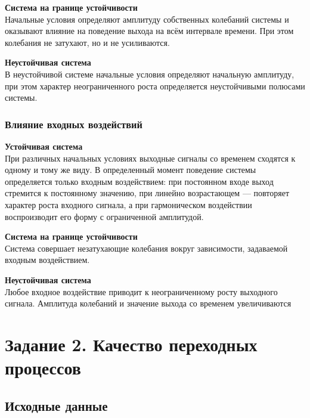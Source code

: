 \documentclass[a5paper, 10pt]{article}
\theoremstyle{definition}
\theoremstyle{plain}
\theoremstyle{remark}
\begin{document}
\vspace{0.2cm}

\textbf{Система на границе устойчивости}\\
Начальные условия определяют амплитуду собственных колебаний системы и оказывают влияние на поведение выхода на всём интервале времени. При этом колебания не затухают, но и не усиливаются.

\vspace{0.2cm}

\textbf{Неустойчивая система}\\
В неустойчивой системе начальные условия определяют начальную амплитуду, при этом характер неограниченного роста определяется неустойчивыми полюсами системы.

\subsubsection{Влияние входных воздействий}

\textbf{Устойчивая система}\\
При различных начальных условиях выходные сигналы со временем сходятся к одному и тому же виду. В определенный момент поведение системы определяется только входным воздействием: при постоянном входе выход стремится к постоянному значению, при линейно возрастающем — повторяет характер роста входного сигнала, а при гармоническом воздействии воспроизводит его форму с ограниченной амплитудой.

\vspace{0.2cm}

\textbf{Система на границе устойчивости}\\
Система совершает незатухающие колебания вокруг зависимости, задаваемой входным воздействием.

\vspace{0.2cm}

\textbf{Неустойчивая система}\\
Любое входное воздействие приводит к неограниченному росту выходного сигнала. Амплитуда колебаний и значение выхода со временем увеличиваются

\section{Задание 2. Качество переходных процессов}

\subsection{Исходные данные}
\end{document}

